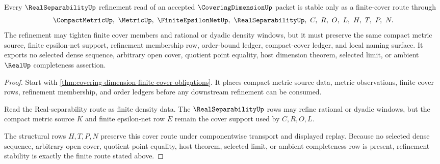 \begin{theorem}
\label{thm:covering-dimension-real-separability-refinement}
Every $\RealSeparabilityUp$ refinement read of an accepted $\CoveringDimensionUp$ packet is stable only as a finite-cover route through
$$
\CompactMetricUp,\ \MetricUp,\ \FiniteEpsilonNetUp,\ \RealSeparabilityUp,\ C,\ R,\ O,\ L,\ H,\ T,\ P,\ N .
$$
The refinement may tighten finite cover members and rational or dyadic density windows, but it must preserve the same compact metric source, finite epsilon-net support, refinement membership row, order-bound ledger, compact-cover ledger, and local naming surface. It exports no selected dense sequence, arbitrary open cover, quotient point equality, host dimension theorem, selected limit, or ambient $\RealUp$ completeness assertion.
\end{theorem}
\begin{proof}
Start with \autoref{thm:covering-dimension-finite-cover-obligations}. It places compact metric source data, metric observations, finite cover rows, refinement membership, and order ledgers before any downstream refinement can be consumed.

Read the Real-separability route as finite density data. The $\RealSeparabilityUp$ rows may refine rational or dyadic windows, but the compact metric source $K$ and finite epsilon-net row $E$ remain the cover support used by $C,R,O,L$.

The structural rows $H,T,P,N$ preserve this cover route under componentwise transport and displayed replay. Because no selected dense sequence, arbitrary open cover, quotient point equality, host theorem, selected limit, or ambient completeness row is present, refinement stability is exactly the finite route stated above.
\end{proof}

